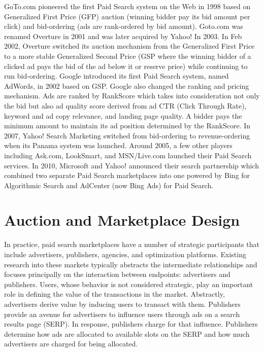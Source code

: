 \documentclass[prodmode,acmtist]{acmsmall} %
\begin{document}
GoTo.com pioneered the first Paid Search system on the Web in 1998 based on Generalized First Price (GFP) auction (winning bidder pay its bid amount per click) and bid-ordering (ads are rank-ordered by bid amount). 
Goto.com was renamed Overture in 2001 and was later acquired by Yahoo! In 2003. 
In Feb 2002, Overture switched its auction mechanism from the Generalized First Price to a more stable Generalized Second Price (GSP where the winning bidder of a clicked ad pays the bid of the ad below it or reserve price) while continuing to run bid-ordering. 
Google introduced its first Paid Search system, named AdWords, in 2002 based on GSP. Google also changed the ranking and pricing mechanism. 
Ads are ranked by RankScore which takes into consideration not only the bid but also ad quality score derived from ad CTR (Click Through Rate), keyword and ad copy relevance, and landing page quality. 
A bidder pays the minimum amount to maintain its ad position determined by the RankScore. 
In 2007, Yahoo! Search Marketing switched from bid-ordering to revenue-ordering when its Panama system was launched. 
Around 2005, a few other players including Ask.com, LookSmart, and MSN/Live.com launched their Paid Search services. 
In 2010, Microsoft and Yahoo! announced their search partnership which combined two separate Paid Search marketplaces into one powered by Bing for Algorithmic Search and AdCenter (now Bing Ads) for Paid Search. 

\section{Auction and Marketplace Design} %
\label{sec:auction_and_marketplace_design}

In practice, paid search marketplaces have a number of strategic participants that include advertisers, publishers, agencies, and optimization platforms.  
Existing research into these markets typically abstracts the intermediate relationships and focuses principally on the interaction between endpoints: advertisers and publishers.  
Users, whose behavior is not considered strategic, play an important role in defining the value of the transactions in the market. 
Abstractly, advertisers derive value by inducing users to transact with them.  
Publishers provide an avenue for advertisers to influence users through ads on a search results page (SERP).  
In response, publishers charge for that influence.  Publishers determine how ads are allocated to available slots on the SERP and how much advertisers are charged for being allocated. 
\end{document}
